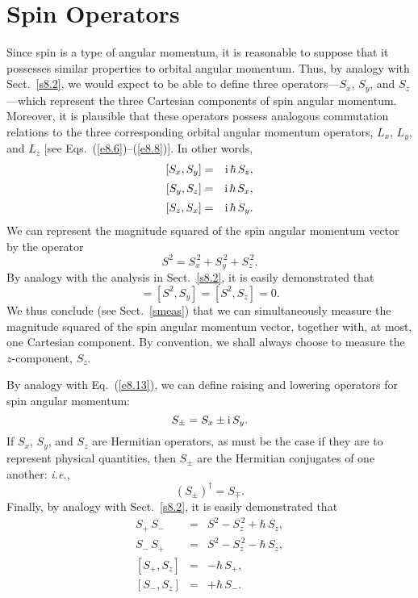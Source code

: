 \section{Spin Operators}\label{s10.2}
Since spin is a type of angular momentum, it is reasonable to suppose
that it possesses similar properties to orbital angular momentum.
Thus, by analogy with Sect.~\ref{s8.2}, we would expect to be able
to define three operators---$S_x$, $S_y$, and $S_z$---which represent
the three Cartesian components of spin angular momentum. Moreover,
it is plausible that these operators
possess
analogous commutation relations to the three corresponding orbital
angular momentum operators, $L_x$, $L_y$, and $L_z$ [see Eqs.~(\ref{e8.6})--(\ref{e8.8})]. In other words,
\begin{eqnarray}\label{e10.1x}
[S_x, S_y]&=& {\rm i}\,\hbar\,S_z,\\[0.5ex]
[S_y, S_z]&=& {\rm i}\,\hbar\,S_x,\\[0.5ex]
[S_z,S_x]&=& {\rm i}\,\hbar\,S_y.\label{e10.2x}
\end{eqnarray}
We can represent the magnitude squared of the spin angular momentum vector by the operator
\begin{equation}
S^2 = S_x^{\,2} + S_y^{\,2}+ S_z^{\,2}.
\end{equation}
By analogy with the analysis in Sect.~\ref{s8.2}, it is
easily demonstrated that
\begin{equation}
[S^2, S_x] = [S^2, S_y] = [S^2,S_z] = 0.
\end{equation}
We thus conclude (see Sect.~\ref{smeas}) that we can simultaneously measure the magnitude squared
of the spin angular momentum vector, together with, at most, one Cartesian component.
By convention, we shall always choose to measure the $z$-component, $S_z$. 

By analogy with Eq.~(\ref{e8.13}), we can define raising and lowering
operators for spin angular momentum:
\begin{equation}
S_\pm = S_x \pm {\rm i}\,S_y.
\end{equation}
If $S_x$, $S_y$, and $S_z$ are Hermitian operators, as must be
the case if they are to represent physical quantities, then $S_\pm$ are
the Hermitian conjugates of one another: {\em i.e.},
\begin{equation}\label{e10.7}
(S_\pm)^\dag = S_\mp.
\end{equation}
Finally, by analogy with Sect.~\ref{s8.2}, it is easily
demonstrated that
\begin{eqnarray}
S_+\,S_- &=& S^2-S_z^{\,2}+\hbar\,S_z,\label{e10.7a}\\[0.5ex]
S_-\,S_+&=& S^2-S_z^{\,2}-\hbar\,S_z,\label{e10.8}\\[0.5ex]
[S_+,S_z]&=& - \hbar\,S_+,\label{e10.9}\\[0.5ex]
[S_-,S_z]&=& +\hbar\,S_-.\label{e10.10}
\end{eqnarray}

